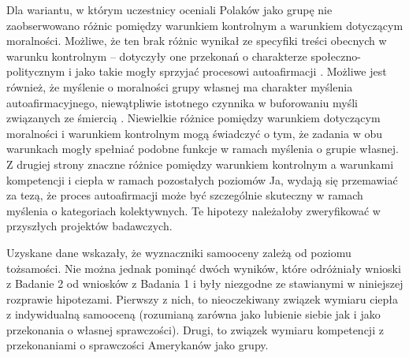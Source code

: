 \documentclass[man]{apa6}
\begin{document}
Dla wariantu, w którym uczestnicy oceniali Polaków jako grupę nie zaobserwowano różnic pomiędzy warunkiem kontrolnym a warunkiem dotyczącym moralności. Możliwe, że ten brak różnic wynikał ze specyfiki treści obecnych w warunku kontrolnym -- dotyczyły one przekonań o charakterze społeczno-politycznym i jako takie mogły sprzyjać procesowi autoafirmacji \parencite{steele1988psychology}. Możliwe jest również, że myślenie o moralności grupy własnej ma charakter myślenia autoafirmacyjnego, niewątpliwie istotnego czynnika w buforowaniu myśli związanych ze śmiercią \parencite{pyszczynski2004people}. Niewielkie różnice pomiędzy warunkiem dotyczącym moralności i warunkiem kontrolnym mogą świadczyć o tym, że zadania w obu warunkach mogły spełniać podobne funkcje w ramach myślenia o grupie własnej. Z drugiej strony znaczne różnice pomiędzy warunkiem kontrolnym a warunkami kompetencji i ciepła w ramach pozostałych poziomów Ja, wydają się przemawiać za tezą, że proces autoafirmacji może być szczególnie skuteczny w ramach myślenia o kategoriach kolektywnych. Te hipotezy należałoby zweryfikować w przyszłych projektów badawczych.

Uzyskane dane wskazały, że wyznaczniki samooceny zależą od poziomu tożsamości. Nie można jednak pominąć dwóch wyników, które odróżniały wnioski z Badanie 2 od wniosków z Badania 1 i były niezgodne ze stawianymi w niniejszej rozprawie hipotezami. Pierwszy z nich, to nieoczekiwany związek wymiaru ciepła z indywidualną samooceną (rozumianą zarówna jako lubienie siebie jak i jako przekonania o własnej sprawczości). Drugi, to związek wymiaru kompetencji z przekonaniami o sprawczości Amerykanów jako grupy.\\
\end{document}
